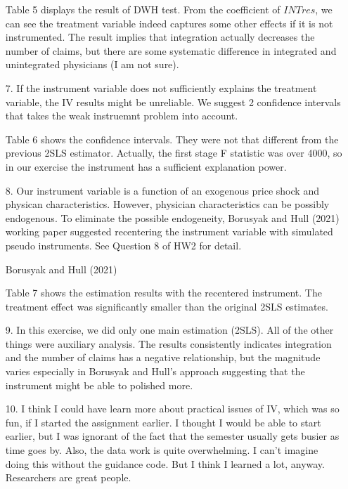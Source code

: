 \documentclass[12pt]{article}
\begin{document}
\begin{itemize}
    Table 5 displays the result of DWH test. From the coefficient of $INTres$, we can see the treatment variable indeed captures some other effects if it is not instrumented. The result implies that integration actually decreases the number of claims, but  there are some systematic difference in integrated and unintegrated physicians (I am not sure).
		
		\item[7.] If the instrument variable does not sufficiently explains the treatment variable, the IV results might be unreliable. We suggest 2 confidence intervals that takes the weak instruemnt problem into account.
		
		
		Table 6 shows the confidence intervals. They were not that different from the previous 2SLS estimator. Actually, the first stage F statistic was over 4000, so in our exercise the instrument has a sufficient explanation power.
			
		\item[8.] Our instrument variable is a function of an exogenous price shock and physican characteristics. However, physician characteristics can be possibly endogenous. To eliminate the possible endogeneity, Borusyak and Hull (2021) working paper suggested recentering the instrument variable with simulated pseudo instruments. See Question 8 of HW2 for detail.
		
		\begin{table}[ht]
    		
    		\caption{Borusyak and Hull (2021)}
		\end{table}

		Table 7 shows the estimation results with the recentered instrument. The treatment effect was significantly smaller than the original 2SLS estimates.

		\item[9.] In this exercise, we did only one main estimation (2SLS). All of the other things were auxiliary analysis. The results consistently indicates integration and the number of claims has a negative relationship, but the magnitude varies especially in Borusyak and Hull's approach suggesting that the instrument might be able to polished more.
		
		\item[10.] I think I could have learn more about practical issues of IV, which was so fun, if I started the assignment earlier. I thought I would be able to start earlier, but I was ignorant of the fact that the semester usually gets busier as time goes by. Also, the data work is quite overwhelming. I can't imagine doing this without the guidance code. But I think I learned a lot, anyway. Researchers are great people.
		
	\end{itemize}
\end{document}
